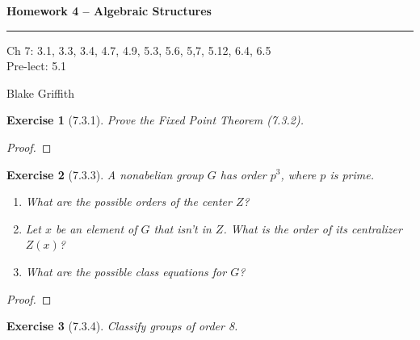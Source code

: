 \documentclass[12pt]{article}
\newtheorem*{exer}{Exercise}
\begin{document}
\textbf{Homework 4 -- Algebraic Structures} \\

\hrule

\begin{minipage}{.80\linewidth}
    \flushleft
    Ch 7: 3.1, 3.3, 3.4, 4.7, 4.9, 5.3, 5.6, 5,7, 5.12, 6.4, 6.5 \\
    Pre-lect: 5.1 \\
\end{minipage}
\begin{minipage}{.20\linewidth}
    \flushright
    Blake Griffith
\end{minipage}

\begin{exer}[7.3.1]

    Prove the Fixed Point Theorem (7.3.2).

\end{exer}

\begin{proof}

\end{proof}


\begin{exer}[7.3.3]

    A nonabelian group $G$ has order $p^3$, where $p$ is prime.

    \begin{enumerate}
        \item What are the possible orders of the center $Z$?

        \item Let $x$ be an element of $G$ that isn't in $Z$. What is
            the order of its centralizer $Z(x)$?

        \item What are the possible class equations for $G$?
    \end{enumerate}

\end{exer}

\begin{proof}

\end{proof}


\begin{exer}[7.3.4]

    Classify groups of order 8.

\end{exer}
\end{document}
